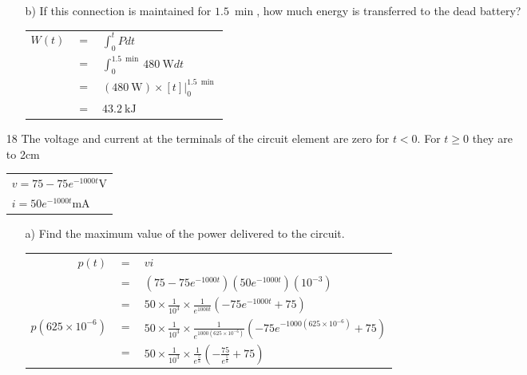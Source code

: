 \documentclass[a4paper]{article}
\newcommand\tab[1][0.5cm]{\hspace*{#1}}
\begin{document}
\begin{itemize}
\begin{itemize}
\begin{tabular}{r c l}
	      	      \end{tabular} 
	      	\item[b)] If this connection is maintained for $\SI{1.5}{\min}$, how much energy is transferred to the dead battery? \\
	      	      \begin{tabular}{r c l}
	      	      	$W(t)$ & $=$ & $\int_{0}^{t} Pdt$                                 \\
	      	      	       & $=$ & $\int_{0}^{\SI{1.5}{\min}} \SI{480}{\watt}dt$      \\
	      	      	       & $=$ & $(\SI{480}{\watt})\times[t]|_{0}^{\SI{1.5}{\min}}$ \\
	      	      	       & $=$ & $\SI{43.2}{\kilo\joule}$                           \\
	      	      \end{tabular}
	      \end{itemize}
	\item[18] The voltage and current at the terminals of the circuit element are zero for $t < 0$. For $t \geq 0$ they are \\
	      \hbox to 2cm{}
	      \tab\begin{tabular}{l}
	      $v = 75 - 75e^{-1000t}\si{\volt}$ \\
	      $i = 50e^{-1000t}\si{\milli\ampere}$
	\end{tabular}
	\begin{itemize}
		\item[a)] Find the maximum value of the power delivered to the circuit. \\
		      \begin{tabular}{r c l}
		      	$p(t)$                & $=$ & $vi$                                                                                                    \\
		      	                      & $=$ & $(75 - 75e^{-1000t})(50e^{-1000t})(10^{-3})$                                                            \\
		      	                      & $=$ & $50\times\frac{1}{10^3}\times\frac{1}{e^{1000t}}(-75e^{-1000t} + 75)$                                   \\
		      	$p(625\times10^{-6})$ & $=$ & $50\times\frac{1}{10^3}\times\frac{1}{e^{1000(625\times10^{-6})}}(-75e^{-1000(625\times10^{-6})} + 75)$ \\
		      	                      & $=$ & $50\times\frac{1}{10^3}\times\frac{1}{e^{\frac{5}{8}}}(-\frac{75}{e^{\frac{5}{8}}} + 75)$               \\

\end{tabular}
\end{itemize}
\end{itemize}
\end{document}
